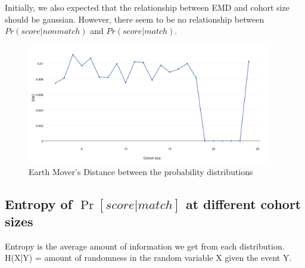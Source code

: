 Initially, we also expected that the relationship between EMD and cohort size should be gaussian. However, there seem to be no relationship between $Pr(score|nonmatch)$ and $Pr(score|match)$.

\begin{figure}[h]
  \centering
  \includegraphics[width=0.95\textwidth]{dataset/otago/emd}
  \caption{Earth Mover's Distance between the probability distributions}
  \label{fig:emd_grand}
\end{figure}

\subsection{Entropy of $\Pr{[score|match]}$ at different cohort sizes}
Entropy is the average amount of information we get from each distribution. H(X|Y) = amount of randomness in the random variable X given the event Y.

